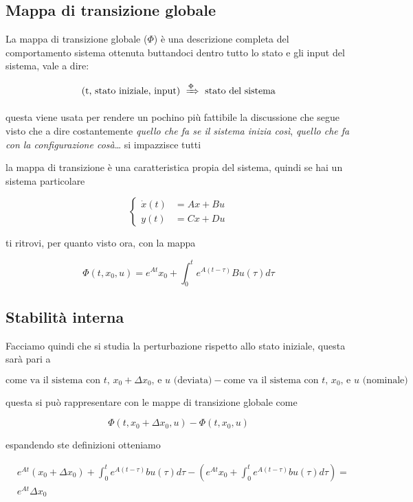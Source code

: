 \documentclass[11pt]{article}
\begin{document}
\subsection{Mappa di transizione globale}
\label{sec:orgd8c689f}
La mappa di transizione globale (\(\Phi\)) è una descrizione completa
del comportamento sistema ottenuta buttandoci dentro tutto lo stato e
gli input del sistema, vale a dire:

\[\text{(t, stato iniziale, input) }
\xRightarrow{\Phi} \text{ stato del sistema} \]

questa viene usata per rendere un pochino più fattibile la discussione che segue
visto che a dire costantemente \emph{quello che fa se il sistema inizia così},
\emph{quello che fa con la configurazione cosà}\ldots{} si impazzisce tutti

la mappa di transizione è una caratteristica propia del sistema, quindi se hai
un sistema particolare

\[\begin{cases}
\dot{x}(t) &= Ax + Bu \\
y(t) &= Cx + Du
\end{cases}\]

ti ritrovi, per quanto visto ora, con la mappa

\[ \Phi (t,x_0,u) = e^{At}x_0 +
\int_{0}^{t} e^{A(t-\tau)} Bu(\tau) d\tau \]

\subsection{Stabilità interna}
\label{sec:org778ad8d}

Facciamo quindi che si studia la perturbazione rispetto allo stato
iniziale, questa sarà pari a

\[ \text{come va il sistema con $t$, $x_0 + \Delta x_0$, e $u$ (deviata)} -
\text{come va il sistema con $t$, $x_0$, e $u$ (nominale)} \] 

questa si può rappresentare con le mappe di transizione globale come

\[ \Phi(t,x_0+ \Delta x_0 ,u) - \Phi(t,x_0 ,u) \]

espandendo ste definizioni otteniamo

\begin{align*}
&e^{At}(x_0 + \Delta x_0) + \int_{0}^{t} e^{A(t-\tau)} bu(\tau) d\tau
- (e^{At}x_0 + \int_{0}^{t} e^{A(t-\tau)} bu(\tau) d\tau) = \\
& e^{At} \Delta x_0
\end{align*}
\end{document}
